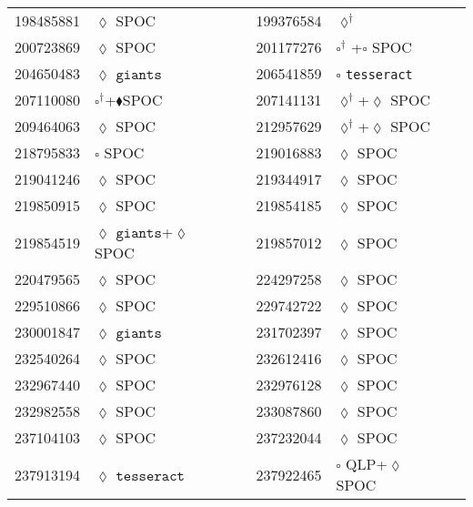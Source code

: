 \begin{longtable}{llrllr}
198485881 & $\lozenge$ SPOC & \cite{TIC_198485881} & 199376584 & $\lozenge^\dagger$ & \cite{TIC_199376584} \\
200723869 & $\lozenge$ SPOC & \cite{TIC_200723869} & 201177276 & $\square^\dagger$ +$\square$ SPOC  & \cite{TIC_201177276} \\
204650483 & $\lozenge$ $\texttt{giants}$ & \cite{TIC_394918211} & 206541859 & $\square$ \texttt{tesseract} & \cite{TIC_157698565} \\
207110080 & $\square^\dagger$+$\blacklozenge$SPOC & \cite{TIC_207110080} & 207141131 & $\lozenge^\dagger$+$\lozenge$ SPOC & \cite{TIC_207141131} \\
209464063 & $\lozenge$ SPOC & \cite{TIC_209464063} & 212957629 & $\lozenge^\dagger$+$\lozenge$ SPOC & \cite{TIC_212957629} \\
218795833 & $\square$ SPOC & \cite{TIC_218795833} & 219016883 & $\lozenge$ SPOC & \cite{TIC_219016883} \\
219041246 & $\lozenge$ SPOC & \cite{TIC_219041246} & 219344917 & $\lozenge$ SPOC & \cite{TIC_159418353} \\
219850915 &  $\lozenge$ SPOC & \cite{TIC_232540264} & 219854185 & $\lozenge$ SPOC & \cite{TIC_219854185} \\
219854519 & $\lozenge$ $\texttt{giants}$+$\lozenge$ SPOC & \cite{TIC_219854519} & 219857012 & $\lozenge$ SPOC & \cite{TIC_232540264} \\
220479565 & $\lozenge$ SPOC & \cite{TIC_220479565} & 224297258 & $\lozenge$ SPOC & \cite{TIC_232540264} \\
229510866 & $\lozenge$ SPOC & \cite{TIC_376637093} & 229742722 & $\lozenge$ SPOC & \cite{TIC_229742722} \\
230001847 & $\lozenge$ $\texttt{giants}$ & \cite{TIC_348835438} & 231702397 & $\lozenge$ SPOC & \cite{TIC_231702397} \\
232540264 & $\lozenge$ SPOC & \cite{TIC_232540264} & 232612416 & $\lozenge$ SPOC & \cite{TIC_232540264} \\
232967440 & $\lozenge$ SPOC & \cite{TIC_232967440} & 232976128 & $\lozenge$ SPOC & \cite{TIC_232540264} \\
232982558 & $\lozenge$ SPOC & \cite{TIC_232540264} & 233087860 & $\lozenge$ SPOC & \cite{TIC_232540264} \\
237104103 & $\lozenge$ SPOC & \cite{TIC_219854185} & 237232044 & $\lozenge$ SPOC & \cite{TIC_232540264} \\
237913194 & $\lozenge$ $\texttt{tesseract}$ & \cite{TIC_237913194} & 237922465 & $\square$ QLP+$\lozenge$ SPOC & \cite{TIC_332558858} \\

\end{longtable}

